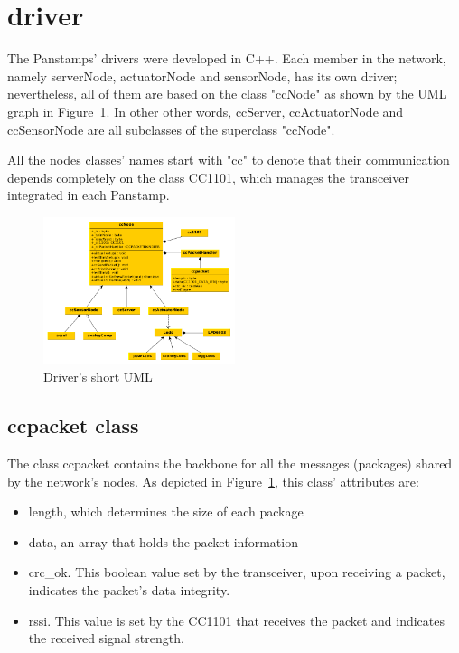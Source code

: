 \section{driver}
The Panstamps' drivers were developed in C++. Each member in the network, namely serverNode, actuatorNode and sensorNode, has its own driver; nevertheless, all of them are based on the class "ccNode" as shown by the UML graph in Figure~\ref{fig:driverUML}. In other other words, ccServer, ccActuatorNode and ccSensorNode are all subclasses of the superclass "ccNode". 

All the nodes classes' names start with "cc" to denote that their communication depends completely on the class CC1101, which manages the transceiver integrated in each Panstamp.

\begin{figure}[h!] 
 \centering
 \includegraphics[width= 0.5\textwidth, clip=true,keepaspectratio=true] {./graph/driver-short.png}
 \caption{Driver's short UML }
 \label{fig:driverUML}
\end{figure}  

\subsection{ccpacket class}

The class ccpacket contains the backbone for all the messages (packages) shared by the network's nodes. As depicted in Figure~\ref{fig:driverUML}, this class' attributes are:
\begin{itemize}
\item length, which determines the size of each package
\item data, an array that holds the packet information
\item crc\_ok. This boolean value set by the transceiver, upon receiving a packet, indicates the packet's data integrity. 
\item rssi. This value is set by the CC1101 that receives the packet and indicates the received signal strength.
\end{itemize}

